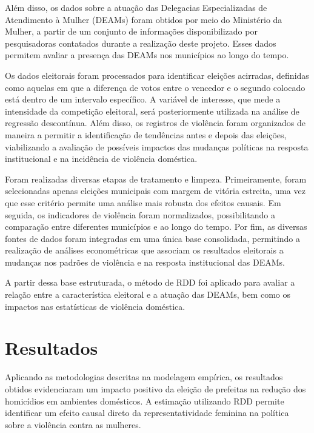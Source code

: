 Além disso, os dados sobre a atuação das Delegacias Especializadas de Atendimento à Mulher (DEAMs) foram obtidos por meio do Ministério da Mulher, a partir de um conjunto de informações disponibilizado por pesquisadoras contatados durante a realização deste projeto. Esses dados permitem avaliar a presença das DEAMs nos municípios ao longo do tempo. 

Os dados eleitorais foram processados para identificar eleições acirradas, definidas como aquelas em que a diferença de votos entre o vencedor e o segundo colocado está dentro de um intervalo específico. A variável de interesse, que mede a intensidade da competição eleitoral, será posteriormente utilizada na análise de regressão descontínua. Além disso, os registros de violência foram organizados de maneira a permitir a identificação de tendências antes e depois das eleições, viabilizando a avaliação de possíveis impactos das mudanças políticas na resposta institucional e na incidência de violência doméstica.

Foram realizadas diversas etapas de tratamento e limpeza. Primeiramente, foram selecionadas apenas eleições municipais com margem de vitória estreita, uma vez que esse critério permite uma análise mais robusta dos efeitos causais. Em seguida, os indicadores de violência foram normalizados, possibilitando a comparação entre diferentes municípios e ao longo do tempo. Por fim, as diversas fontes de dados foram integradas em uma única base consolidada, permitindo a realização de análises econométricas que associam os resultados eleitorais a mudanças nos padrões de violência e na resposta institucional das DEAMs.

A partir dessa base estruturada, o método de RDD foi aplicado para avaliar a relação entre a característica eleitoral e a atuação das DEAMs, bem como os impactos nas estatísticas de violência doméstica. 


\section{Resultados}

Aplicando as metodologias descritas na modelagem empírica, os resultados obtidos evidenciaram um impacto positivo da eleição de prefeitas na redução dos homicídios em ambientes domésticos. A estimação utilizando RDD permite identificar um efeito causal direto da representatividade feminina na política sobre a violência contra as mulheres.



